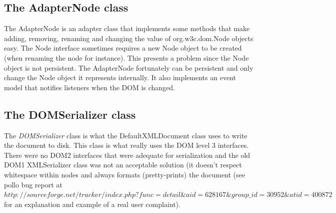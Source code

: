 \documentclass[12pt]{article}
\begin{document}
\subsection{The AdapterNode class}
The AdapterNode is an adapter class that implements some methods that make
adding, removing, renaming and changing the value of org.w3c.dom.Node objects
easy. The Node interface sometimes requires a new Node object to be created
(when renaming the node for instance). This presents a problem since the Node
object is not persistent. The AdapterNode fortunately can be persistent and only
change the Node object it represents internally. It also implements an event
model that notifies listeners when the DOM is changed.

\subsection{The DOMSerializer class}
The \emph{DOMSerializer} class is what the DefaultXMLDocument class uses to
write the document to disk. This class is what really uses the DOM level 3
interfaces. There were no DOM2 interfaces that were adequate for serialization
and the old DOM1 XMLSerializer class was not an acceptable solution (it doesn't
respect whitespace within nodes and always formats (pretty-prints) the document
(see pollo bug report at\\{
\small
$http://sourceforge.net/tracker/index.php?func=detail\&aid=628167\&group\_id=30952\&atid=400872$}\\
for an explanation and example of a real user complaint).
\end{document}
